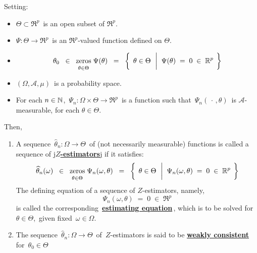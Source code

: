 \begin{definition}[$Z$-Estimators]
\mbox{}
\vskip 0.1cm
\noindent
Setting:
\begin{itemize}
\item
	$\Theta \subset \Re^{p}$\, is an open subset of $\Re^{p}$.
\item
	$\Psi : \Theta \longrightarrow \Re^{p}$\, is an $\Re^{p}$-valued function defined on $\Theta$.
\item
	\begin{equation*}
	\theta_{0}
	\;\; \in \;\;
		\underset{\theta\overset{{\color{white}.}}{\in}\Theta}{\zeros}\; \Psi(\theta)
	\;\; = \;\;
		\left\{\;\,
			\theta \in \Theta
			\,\;\left\vert\;\;
				\overset{{\color{white}1}}{\Psi}(\theta) \;=\; 0 \;\in\; \Re^{p}
				\right.
			\;\right\}
	\end{equation*}
\item
	$(\Omega,\mathcal{A},\mu)$\, is a probability space.
\item
	For each $n \in \mathbb{N}$, \,$\Psi_{n} : \Omega \times \Theta \longrightarrow \Re^{p}$\,
	is a function such that \,$\Psi_{n}(\,\cdot\,,\theta)$\, is $\mathcal{A}$-measurable,
	for each $\theta \in \Theta$.
\end{itemize}
Then,
\begin{enumerate}
\item
	A sequence
	\,$\widehat{\theta}_{n} : \Omega \longrightarrow \Theta$\,
	of (not necessarily measurable) functions
	is called a sequence of \underline{{\color{white}j}\textbf{$Z$-estimators}{\color{white}j}}
	if it satisfies:
	\begin{equation*}
	\widehat{\theta}_{n}(\omega)
	\;\; \in \;\;
		\underset{\theta\overset{{\color{white}.}}{\in}\Theta}{\zeros}\; \Psi_{n}(\omega,\theta)
	\;\; = \;\;
		\left\{\;\,
			\theta \in \Theta
			\,\;\left\vert\;\;
				\overset{{\color{white}1}}{\Psi}_{n}(\omega,\theta) \;=\; 0 \;\in\; \Re^{p}
				\right.
			\;\right\}
	\end{equation*}
	The defining equation of a sequence of $Z$-estimators, namely,
	\begin{equation*}
	\Psi_{n}(\omega,\theta) \;=\; 0 \;\in\; \Re^{p}
	\end{equation*}
	is called the corresponding \,\underline{\textbf{estimating equation}}\,,
	which is to be solved for \,$\theta \in \Theta$,\, given fixed \,$\omega \in \Omega$.\,
\item
	The sequence
	\,$\widehat{\theta}_{n} : \Omega \longrightarrow \Theta$\,
	of \,$Z$-estimators is said to be
	\underline{\textbf{weakly consistent}}\, for \,$\theta_{0} \in \Theta$\,

\end{enumerate}
\end{definition}
